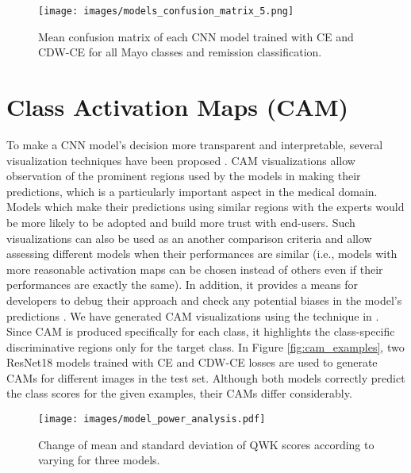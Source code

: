 \documentclass[runningheads]{llncs}
\begin{document}
\begin{figure}[t!]
  \centering
  \texttt{[image: images/models\_confusion\_matrix\_5.png]}
  \caption{Mean confusion matrix of each CNN model trained with CE and CDW-CE for all Mayo classes and remission classification.}
  \label{fig:models_confusion_matrix}
\end{figure}


\section{Class Activation Maps (CAM)}

To make a CNN model's decision more transparent and interpretable, several visualization techniques have been proposed \cite{zhou2016learning,selvaraju2017grad}. CAM visualizations allow observation of the prominent regions used by the models in making their predictions, which is a particularly important aspect in the medical domain. Models which make their predictions using similar regions with the experts would be more likely to be adopted and build more trust with end-users. Such visualizations can also be used as an another comparison criteria and allow assessing different models when their performances are similar (i.e., models with more reasonable activation maps can be chosen instead of others even if their performances are exactly the same).  In addition, it provides a means for developers to debug their approach and check any potential biases in the model's predictions \cite{selvaraju2017grad}. We have generated CAM visualizations using the technique in \cite{zhou2016learning}. Since CAM is produced specifically for each class, it highlights the class-specific discriminative regions only for the target class. In Figure \ref{fig:cam_examples}, two ResNet18 models trained with CE and CDW-CE losses are used to generate CAMs for different images in the test set. Although both models correctly predict the class scores for the given examples, their CAMs differ considerably.   

\begin{figure}[t!]
  \centering
  \texttt{[image: images/model\_power\_analysis.pdf]}
  \caption{Change of mean and standard deviation of QWK scores according to varying  for three models.}
  \label{fig:power_analysis}
\end{figure}
\end{document}
